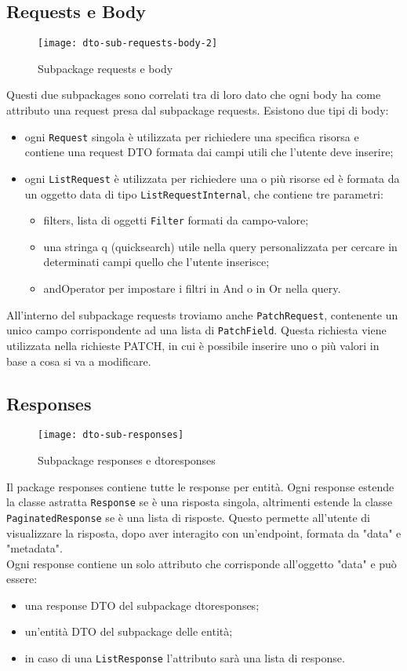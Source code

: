 \subsection{Requests e Body}
\begin{figure}[H] 
    \centering 
    \texttt{[image: dto-sub-requests-body-2]} 
    \caption{Subpackage requests e body}
\end{figure}
Questi due subpackages sono correlati tra di loro dato che ogni body ha come attributo una request presa dal subpackage requests.
Esistono due tipi di body:
\begin{itemize}
\item ogni \texttt{Request} singola è utilizzata per richiedere una specifica risorsa e contiene una request DTO formata dai campi utili che l'utente deve inserire;
\item ogni \texttt{ListRequest} è utilizzata per richiedere una o più risorse ed è formata da un oggetto data di tipo \texttt{ListRequestInternal}, che contiene tre parametri:
\begin{itemize}
\item filters, lista di oggetti \texttt{Filter} formati da campo-valore;
\item una stringa q (quicksearch) utile nella query personalizzata per cercare in determinati campi quello che l'utente inserisce;
\item andOperator per impostare i filtri in And o in Or nella query.
\end{itemize} 
\end{itemize}
All'interno del subpackage requests troviamo anche \texttt{PatchRequest}, contenente un unico campo corrispondente ad una lista di \texttt{PatchField}. Questa richiesta viene utilizzata nella richieste PATCH, in cui è possibile inserire uno o più valori in base a cosa si va a modificare.

\subsection{Responses}
\begin{figure}[H] 
    \centering 
    \texttt{[image: dto-sub-responses]} 
    \caption{Subpackage responses e dtoresponses}
\end{figure}
Il package responses contiene tutte le response per entità. Ogni response estende la classe astratta \texttt{Response} se è una risposta singola, altrimenti estende la classe \texttt{PaginatedResponse} se è una lista di risposte. Questo permette all'utente di visualizzare la risposta, dopo aver interagito con un'endpoint, formata da "data" e "metadata".\\
Ogni response contiene un solo attributo che corrisponde all'oggetto "data" e può essere:
\begin{itemize}
\item una response DTO del subpackage dtoresponses;
\item un'entità DTO del subpackage delle entità;
\item in caso di una \texttt{ListResponse} l'attributo sarà una lista di response.
\end{itemize}